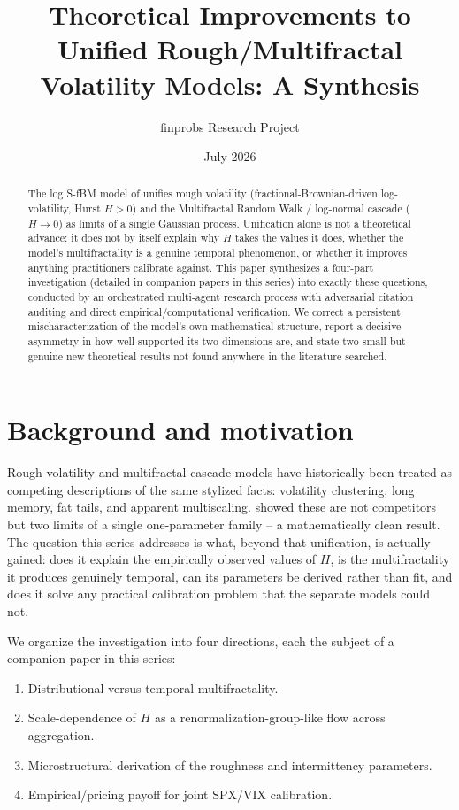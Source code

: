 \documentclass[11pt]{article}
\title{Theoretical Improvements to Unified Rough/Multifractal\\ Volatility Models: A Synthesis}
\author{finprobs Research Project}
\date{July 2026}
\begin{document}
\maketitle

\begin{abstract}
The log S-fBM model of \citet{wu2022rough} unifies rough volatility (fractional-Brownian-driven log-volatility, Hurst $H>0$) and the Multifractal Random Walk / log-normal cascade ($H\to0$) as limits of a single Gaussian process. Unification alone is not a theoretical advance: it does not by itself explain why $H$ takes the values it does, whether the model's multifractality is a genuine temporal phenomenon, or whether it improves anything practitioners calibrate against. This paper synthesizes a four-part investigation (detailed in companion papers in this series) into exactly these questions, conducted by an orchestrated multi-agent research process with adversarial citation auditing and direct empirical/computational verification. We correct a persistent mischaracterization of the model's own mathematical structure, report a decisive asymmetry in how well-supported its two dimensions are, and state two small but genuine new theoretical results not found anywhere in the literature searched.
\end{abstract}

\section{Background and motivation}

Rough volatility \citep{gatheral2018volatility,eleuch2018microstructural} and multifractal cascade models \citep{bacry2003multifractal} have historically been treated as competing descriptions of the same stylized facts: volatility clustering, long memory, fat tails, and apparent multiscaling. \citet{wu2022rough} showed these are not competitors but two limits of a single one-parameter family -- a mathematically clean result. The question this series addresses is what, beyond that unification, is actually gained: does it explain the empirically observed values of $H$, is the multifractality it produces genuinely temporal, can its parameters be derived rather than fit, and does it solve any practical calibration problem that the separate models could not.

We organize the investigation into four directions, each the subject of a companion paper in this series:
\begin{enumerate}
\item[\textbf{P1}] Distributional versus temporal multifractality.
\item[\textbf{P2}] Scale-dependence of $H$ as a renormalization-group-like flow across aggregation.
\item[\textbf{P3}] Microstructural derivation of the roughness and intermittency parameters.
\item[\textbf{P4}] Empirical/pricing payoff for joint SPX/VIX calibration.
\end{enumerate}
\end{document}

